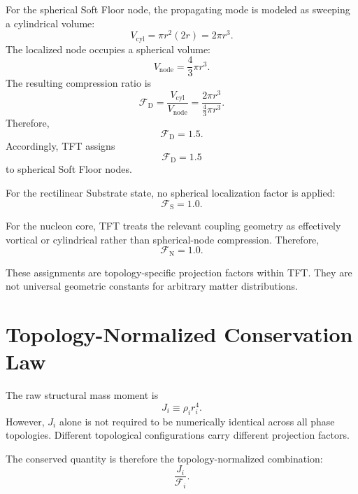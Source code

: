 For the spherical Soft Floor node, the propagating mode is modeled as sweeping a cylindrical volume:
\begin{equation}
    V_{\mathrm{cyl}} = \pi r^2(2r) = 2\pi r^3.
\end{equation}
The localized node occupies a spherical volume:
\begin{equation}
    V_{\mathrm{node}} = \frac{4}{3}\pi r^3.
\end{equation}
The resulting compression ratio is
\begin{equation}
    \mathcal{F}_{\mathrm{D}} = \frac{V_{\mathrm{cyl}}}{V_{\mathrm{node}}} = \frac{2\pi r^3}{\frac{4}{3}\pi r^3}.
\end{equation}
Therefore,
\begin{equation}
    \mathcal{F}_{\mathrm{D}} = 1.5.
\end{equation}
Accordingly, TFT assigns
\begin{equation}
    \mathcal{F}_{\mathrm{D}} = 1.5
\end{equation}
to spherical Soft Floor nodes.

For the rectilinear Substrate state, no spherical localization factor is applied:
\begin{equation}
    \mathcal{F}_{\mathrm{S}} = 1.0.
\end{equation}

For the nucleon core, TFT treats the relevant coupling geometry as effectively vortical or cylindrical rather than spherical-node compression. Therefore,
\begin{equation}
    \mathcal{F}_{\mathrm{N}} = 1.0.
\end{equation}

These assignments are topology-specific projection factors within TFT. They are not universal geometric constants for arbitrary matter distributions.

\section{Topology-Normalized Conservation Law}
The raw structural mass moment is
\begin{equation}
    J_i \equiv \rho_i r_i^4.
\end{equation}
However, $J_i$ alone is not required to be numerically identical across all phase topologies. Different topological configurations carry different projection factors.

The conserved quantity is therefore the topology-normalized combination:
\begin{equation}
    \frac{J_i}{\mathcal{F}_i}.
\end{equation}


